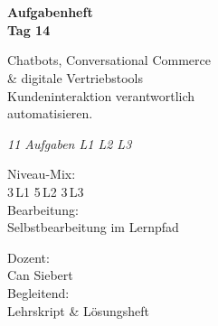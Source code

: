 \documentclass[11pt,a4paper,oneside]{article}
\newcommand{\caveatfontfallback}{\itshape}
\newcommand\caveatfont{\caveatfontfallback}%
\begin{document}
\begin{titlepage}
  \pagestyle{empty}
  \vspace*{1.5cm}
  \\[2pt]
  \noindent{\color{lpAccent}\rule{\linewidth}{1.2pt}}\\[4pt]

  \vspace{3cm}
  {\sffamily\fontsize{30}{34}\selectfont\bfseries\color{lpInk}Aufgabenheft\\Tag 14\par}

  \vspace{0.7cm}
  {\sffamily\large\color{lpGray}Chatbots, Conversational Commerce\\\& digitale Vertriebstools \textendash{}\\Kundeninteraktion verantwortlich\\automatisieren.\par}

  \vspace{1.5cm}
  {\caveatfont\LARGE\color{lpAmber}11 Aufgaben \textperiodcentered{} L1 \textperiodcentered{} L2 \textperiodcentered{} L3}\par

  \vfill

  \noindent\begin{minipage}{0.55\linewidth}
    {\sffamily\footnotesize\color{lpGray}Niveau-Mix:}\\
    {\sffamily\small\color{lpInk}3\,\textsf{L1} \textperiodcentered{} 5\,\textsf{L2} \textperiodcentered{} 3\,\textsf{L3}}\\[10pt]
    {\sffamily\footnotesize\color{lpGray}Bearbeitung:}\\
    {\sffamily\small\color{lpInk}Selbstbearbeitung im Lernpfad}
  \end{minipage}\hfill
  \begin{minipage}{0.4\linewidth}
    \raggedleft
    {\sffamily\footnotesize\color{lpGray}Dozent:}\\
    {\sffamily\small\color{lpInk}Can Siebert}\\[10pt]
    {\sffamily\footnotesize\color{lpGray}Begleitend:}\\
    {\sffamily\small\color{lpInk}Lehrskript \& Lösungsheft}
  \end{minipage}

  \vspace{0.5cm}
  \noindent{\color{lpAccent}\rule{\linewidth}{0.6pt}}
\end{titlepage}
\end{document}

